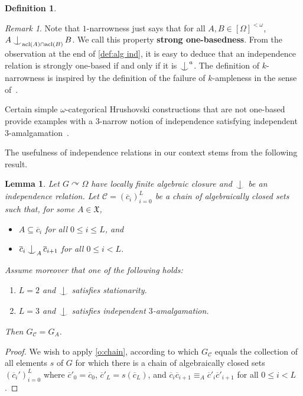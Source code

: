 \documentclass{article}
\newtheorem{lemma}[theorem]{Lemma}
\theoremstyle{remark}
\newtheorem{remark}[theorem]{Remark}
\theoremstyle{definition}
\newtheorem{definition}[theorem]{Definition}
\def\acts{\curvearrowright}
\DeclareMathOperator{\acl}{acl}
\newcommand{\C}[0]{\mathcal{C}}
\newcommand{\X}[0]{\mathfrak{X}}
\def\Ind#1#2{#1\setbox0=\hbox{$#1x$}\kern\wd0\hbox to 0pt{\hss$#1\mid$\hss}
	\lower.9\ht0\hbox to 0pt{\hss$#1\smile$\hss}\kern\wd0}
\def\ind{\mathop{\mathpalette\Ind{}}}
\newcommand{\orq}[0]{\equiv}
\renewcommand\leq{\leqslant}
\begin{document}
{{{{{\begin{definition}
\end{definition}

\begin{remark}\label{rem:onebased}
 Note that $1$-narrowness just says that for all $A, B\in[\Omega]^{<\omega}$, $A\ind_{\acl(A)\cap\acl(B)} B$. We call this property \textbf{strong one-basedness}. From the observation at the end of \cref{def:alg ind},  it is easy to deduce that an independence relation is strongly one-based if and only if it is $\ind^{a}$. The definition of $k$-narrowness is inspired by the definition of the failure of $k$-ampleness in the sense of~\cite{palacin2013ample}.
\end{remark}


 
 {Certain simple $\omega$-categorical Hrushovski constructions
 that are not one-based} provide
  examples with a $3$-narrow notion of independence satisfying independent
  $3$-amalgamation~\cite[Section~3E]{ghaddln24}. 




    




 
  The usefulness of independence relations in our context stems from the following result. 
  \begin{lemma}
   	\label{l:reaching over the empty set}  Let $G\acts\Omega$ have locally finite algebraic closure and $\ind$ be an independence relation. Let $\C = (\overline{c}_i)_{i=0}^{L}$ be a chain
  of algebraically closed sets such that, for some $A \in \X$,
    \begin{itemize}
    	\item $A\subseteq \overline{c}_{i}$ for all $0\leq i\leq L$, and
    	\item $\overline{c}_{i}\ind_{A} \overline{c}_{i+1}$ for all $0\leq i<L$.
    \end{itemize} 
    Assume moreover that one of the following holds:
    \begin{enumerate}[label=(\Alph*)]
   		\item \label{sta case} $L=2$ and $\ind$ satisfies stationarity.
   		\item \label{independent amalgamation case} $L=3$ and $\ind$ satisfies  independent $3$-amalgamation. 
   	\end{enumerate}   
    Then $G_{\mathcal{C}}=G_{A}$.
  \end{lemma} 
  \begin{proof}
  	We wish to apply \cref{o:chain}, according to which $G_{\mathcal{C}}$ equals the collection of all elements $s$ of %
    {$G$}     for which there is a chain of algebraically closed sets $(\overline{c}_{i}')_{i=0}^{L}$ where $\overline{c}'_{0}=\overline{c}_{0}$, $\overline{c}'_{L}=s(\overline{c}_{L})$, and 
  	$\overline{c}_{i}\overline{c}_{i+1}\orq_{A}\overline{c}'_{i}\overline{c}'_{i+1}$ for all $0\leq i< L$. 
  	

\end{proof}}}}}}
\end{document}
